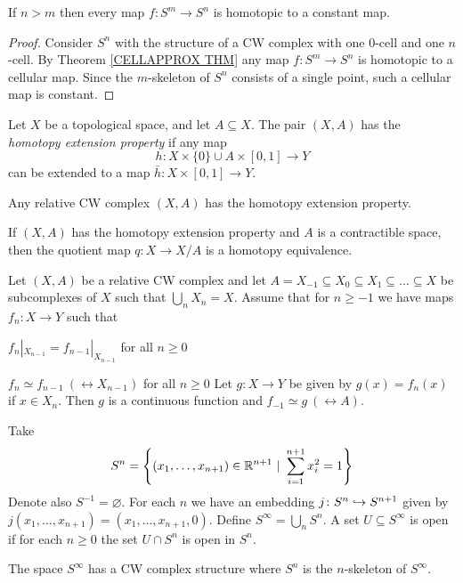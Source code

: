 \begin{corollary}
\label{SMSNCONTRACT COR}
If $n> m$ then every map $f\colon S^{m} \to S^{n}$ is homotopic to a constant map. 
\end{corollary}

\begin{proof}
Consider $S^{n}$ with the structure of a CW complex with one $0$-cell and 
one $n$-cell. By Theorem \ref{CELLAPPROX THM} any map $f\colon S^{m}\to S^{n}$
is homotopic to a cellular map. Since the $m$-skeleton of $S^{n}$ consists of 
a single point, such a cellular map is constant.
\end{proof}


\begin{definition}
Let $X$ be a topological space, and let $A\subseteq X$. The pair $(X, A)$ has the 
\emph{homotopy extension property} if any map 
$$h\colon X\times \{0\} \cup A\times [0, 1] \to Y$$
can be extended to a map $\bar{h}\colon X \times [0, 1] \to Y$.  
\end{definition}


\begin{theorem}
\label{HEP REL CW THM}
Any relative CW complex $(X, A)$ has the homotopy extension property. 
\end{theorem}

\begin{proposition}
\label{CONTR QUOTIENT WITH HEP PROP}
If $(X, A)$ has the homotopy extension property and $A$ is a contractible space, then the quotient map  $q\colon X \to X/A$ is a homotopy equivalence. 
\end{proposition}


\begin{INDUCTIVEHOMOTLEMMA}
\label{INDUCTIVEHOMOT LEMMA}
Let $(X, A)$ be a relative CW complex and let $A = X_{-1} \subseteq X_{0}\subseteq X_{1} \subseteq \dots  \subseteq X$
be subcomplexes of $X$ such that $\bigcup_{n} X_{n} = X$. Assume that for $n\geq -1$ we have 
maps $f_{n}\colon X \to Y$ such that 
\benu
\item $f_{n}|_{X_{n-1}} = f_{n-1}|_{X_{n-1}}$ for all $n \geq 0$
\item $f_{n}\simeq f_{n-1} \ (\rel X_{n-1})$ for all $n\geq 0$
\eenu
Let $g\colon X \to Y$ be given by $g(x) = f_{n}(x)$ if $x\in X_{n}$. 
Then $g$ is a continuous function and $f_{-1}\simeq g \  (\rel A)$.
\end{INDUCTIVEHOMOTLEMMA}

\begin{example}
Take
$$S^{n} = \left\{(x_{1},\dots, x_{n+1})\in {\mathbb R}^{n+1} \ | \ \sum_{i=1}^{n+1} x_{i}^{2} = 1\right\}$$
Denote also $S^{-1} = \varnothing$.
For each $n$ we have an embedding $j\colon S^{n} \hookrightarrow S^{n+1}$ given by 
$j(x_{1}, \dots, x_{n+1}) = (x_{1}, \dots, x_{n+1}, 0)$. 
Define $S^{\infty} = \bigcup_{n} S^{n}$. A set $U\subseteq S^{\infty}$ is open if for each 
$n \geq 0$ the set $U\cap S^{n}$ is open in $S^{n}$. 

The space $S^{\infty}$ has a CW complex structure where $S^{n}$ is the $n$-skeleton 
of $S^{\infty}$. 
\end{example}


